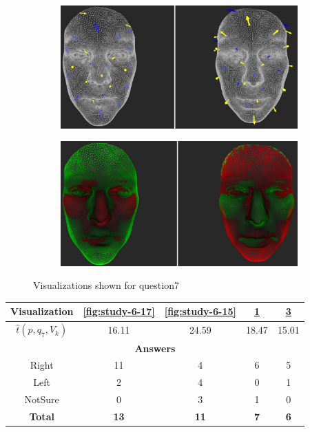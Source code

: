 \begin{figure}[h]
\begin{subfigure}{0.4\textwidth}
\includegraphics[width=\textwidth]{./screenshots/pair18.PNG}
\caption{}
\label{fig:study-6-18}
\end{subfigure}
\quad
\begin{subfigure}{0.4\textwidth}
\includegraphics[width=\textwidth]{./screenshots/pair16.PNG}
\caption{}
\label{fig:study-6-16}
\end{subfigure}
\caption{Visualizations shown for question7}
\end{figure}
\medskip

\begin{center}
\begin{tabular}{| c | c | c | c | c |}
	\hline
	Visualization & \ref{fig:study-6-17} & \ref{fig:study-6-15} & \ref{fig:study-6-18} & \ref{fig:study-6-16}\\ \hline
	\(\widehat{t}(p, q_7, V_k)\) & 16.11 & 24.59 & 18.47 & 15.01\\ \hline
	\multicolumn{5}{|c|}{\bf Answers} \\ \hline
	Right & 11 & 4 & 6 & 5\\ \hline
	Left & 2 & 4 & 0 & 1\\ \hline
	NotSure & 0 & 3 & 1 & 0\\ \hline
	{\bf Total} & {\bf 13} & {\bf 11} & {\bf 7} & {\bf 6}\\ \hline
\end{tabular}
\end{center}
\clearpage

